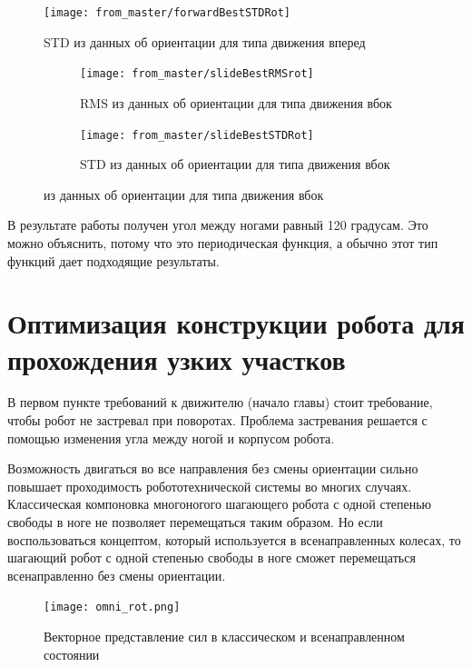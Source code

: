 \begin{figure}[H]
\centering\texttt{[image: from\_master/forwardBestSTDRot]} 
\caption{STD из данных об ориентации для типа движения вперед}
\label{fig:forwardBestSTDRot}
\end{figure}

\begin{figure}[H]
\begin{subfigure}{1\textwidth}
\centering\texttt{[image: from\_master/slideBestRMSrot]} 
\caption{RMS из данных об ориентации для типа движения вбок}
\label{fig:slideBestRMSrot}
\end{subfigure}

\begin{subfigure}{1\textwidth}
\centering\texttt{[image: from\_master/slideBestSTDRot]} 
\caption{STD из данных об ориентации для типа движения вбок}
\label{fig:slideBestSTDRot}
\end{subfigure}
 
\caption{из данных об ориентации для типа движения вбок}
\label{fig:slideOrientation}
\end{figure}

В результате работы получен угол между ногами равный 120 градусам. Это можно объяснить, потому что это периодическая функция, а обычно этот тип функций дает подходящие результаты.

\section{Оптимизация конструкции робота для прохождения узких участков}

В первом пункте требований к движителю (начало главы) стоит требование, чтобы робот не застревал при поворотах. Проблема застревания решается с помощью изменения угла между ногой и корпусом робота.

Возможность двигаться во все направления без смены ориентации сильно повышает проходимость робототехнической системы во многих случаях. Классическая компоновка многоногого шагающего робота с одной степенью свободы в ноге не позволяет перемещаться таким образом. Но если воспользоваться концептом, который используется в всенаправленных колесах, то шагающий робот с одной степенью свободы в ноге сможет перемещаться всенаправленно без смены ориентации.

\begin{figure}[H]
    \centering\texttt{[image: omni\_rot.png]}
    \caption{Векторное представление сил в классическом и всенаправленном состоянии}
    \label{fig:omnidirection}
\end{figure}


